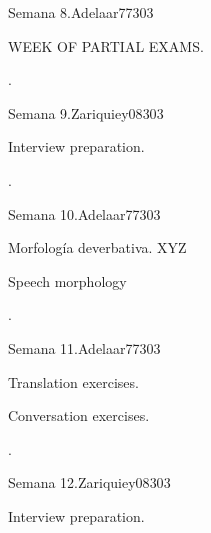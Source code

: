 \begin{syllabus}
\begin{unit}{}{Semana 8.}{Adelaar77}{30}{3}
   \begin{topics}
      \item WEEK OF PARTIAL EXAMS.
   \end{topics}

   \begin{learningoutcomes}
      \item .
   \end{learningoutcomes}
\end{unit}

\begin{unit}{}{Semana 9.}{Zariquiey08}{30}{3}
   \begin{topics}
      \item Interview preparation.
   \end{topics}

   \begin{learningoutcomes}
      \item .
   \end{learningoutcomes}
\end{unit}

\begin{unit}{}{Semana 10.}{Adelaar77}{30}{3}
   \begin{topics}
      \item Morfología deverbativa. XYZ
      \item Speech morphology
   \end{topics}

   \begin{learningoutcomes}
      \item .
   \end{learningoutcomes}
\end{unit}

\begin{unit}{}{Semana 11.}{Adelaar77}{30}{3}
   \begin{topics}
      \item Translation exercises.
      \item Conversation exercises.
   \end{topics}

   \begin{learningoutcomes}
      \item . 
   \end{learningoutcomes}
\end{unit}

\begin{unit}{}{Semana 12.}{Zariquiey08}{30}{3}
   \begin{topics}
      \item Interview preparation.
   \end{topics}


\end{unit}
\end{syllabus}
